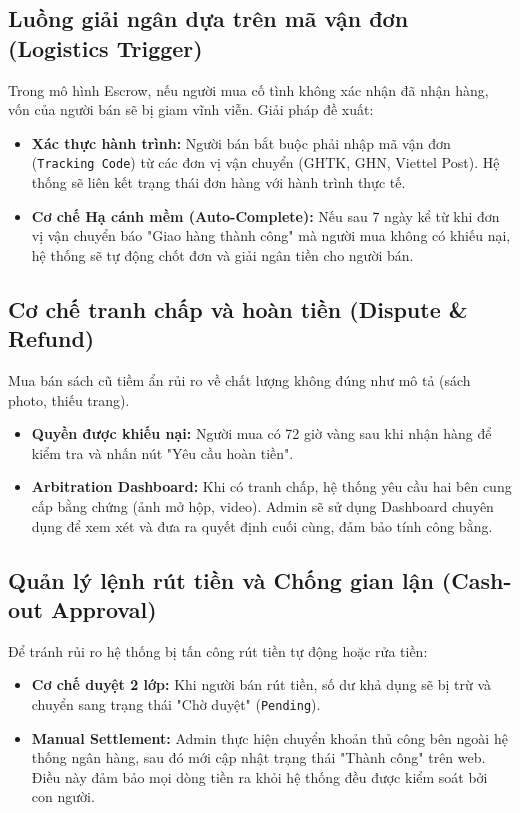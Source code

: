 \documentclass[../main.tex]{subfiles}
\begin{document}
\subsection{Luồng giải ngân dựa trên mã vận đơn (Logistics Trigger)}
Trong mô hình Escrow, nếu người mua cố tình không xác nhận đã nhận hàng, vốn của người bán sẽ bị giam vĩnh viễn. Giải pháp đề xuất:
\begin{itemize}
    \item \textbf{Xác thực hành trình:} Người bán bắt buộc phải nhập mã vận đơn (\texttt{Tracking Code}) từ các đơn vị vận chuyển (GHTK, GHN, Viettel Post). Hệ thống sẽ liên kết trạng thái đơn hàng với hành trình thực tế.
    \item \textbf{Cơ chế Hạ cánh mềm (Auto-Complete):} Nếu sau 7 ngày kể từ khi đơn vị vận chuyển báo "Giao hàng thành công" mà người mua không có khiếu nại, hệ thống sẽ tự động chốt đơn và giải ngân tiền cho người bán.
\end{itemize}

\subsection{Cơ chế tranh chấp và hoàn tiền (Dispute \& Refund)}
Mua bán sách cũ tiềm ẩn rủi ro về chất lượng không đúng như mô tả (sách photo, thiếu trang). 
\begin{itemize}
    \item \textbf{Quyền được khiếu nại:} Người mua có 72 giờ vàng sau khi nhận hàng để kiểm tra và nhấn nút "Yêu cầu hoàn tiền". 
    \item \textbf{Arbitration Dashboard:} Khi có tranh chấp, hệ thống yêu cầu hai bên cung cấp bằng chứng (ảnh mở hộp, video). Admin sẽ sử dụng Dashboard chuyên dụng để xem xét và đưa ra quyết định cuối cùng, đảm bảo tính công bằng.
\end{itemize}

\subsection{Quản lý lệnh rút tiền và Chống gian lận (Cash-out Approval)}
Để tránh rủi ro hệ thống bị tấn công rút tiền tự động hoặc rửa tiền:
\begin{itemize}
    \item \textbf{Cơ chế duyệt 2 lớp:} Khi người bán rút tiền, số dư khả dụng sẽ bị trừ và chuyển sang trạng thái "Chờ duyệt" (\texttt{Pending}). 
    \item \textbf{Manual Settlement:} Admin thực hiện chuyển khoản thủ công bên ngoài hệ thống ngân hàng, sau đó mới cập nhật trạng thái "Thành công" trên web. Điều này đảm bảo mọi dòng tiền ra khỏi hệ thống đều được kiểm soát bởi con người.
\end{itemize}
\end{document}
